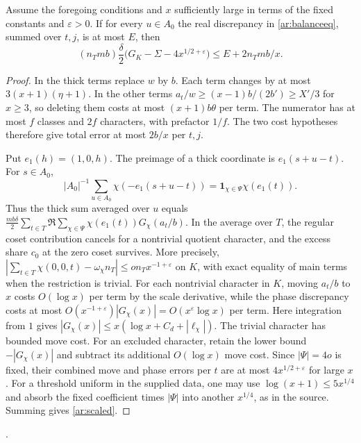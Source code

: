 \begin{lemma}\label{ar:extract}
Assume the foregoing conditions and \(x\) sufficiently large in terms of the fixed constants and \(\varepsilon>0\). If for every \(u\in A_0\) the real discrepancy in \eqref{ar:balanceeq}, summed over \(t,j\), is at most \(E\), then
\[
 (n_Tmb)\frac{\delta}{2}\bigl(G_K-\Sigma-4x^{1/2+\varepsilon}\bigr)
 \le E+2n_Tmb/x.
 \tag{*}\label{ar:scaled}
\]
\end{lemma}
\begin{proof}
In the thick terms replace \(w\) by \(b\). Each term changes by at most \(3(x+1)(\eta+1)\). In the other terms \(a_t/w\ge (x-1)b/(2b')\ge X'/3\) for \(x\ge3\), so deleting them costs at most \((x+1)b\theta\) per term. The numerator has at most \(f\) classes and \(2f\) characters, with prefactor \(1/f\). The two cost hypotheses therefore give total error at most \(2b/x\) per \(t,j\).

Put \(e_1(h)=(1,0,h)\). The preimage of a thick coordinate is \(e_1(s+u-t)\). For \(s\in A_0\),
\[
 |A_0|^{-1}\sum_{u\in A_0}\chi(-e_1(s+u-t))
 =\mathbf1_{\chi\in\Psi}\chi(e_1(t)).
\]
Thus the thick sum averaged over \(u\) equals
\(\frac{mb\delta}{2}\sum_{t\in T}\Re\sum_{\chi\in\Psi}\chi(e_1(t))G_\chi(a_t/b)\).
In the average over \(T\), the regular coset contribution cancels for a nontrivial quotient character, and the excess share \(c_0\) at the zero coset survives. More precisely,
\(\left|\sum_{t\in T}\chi(0,0,t)-\omega_\chi n_T\right|\le o n_T x^{-1+\varepsilon}\)
on \(K\), with exact equality of main terms when the restriction is trivial. For each nontrivial character in \(K\), moving \(a_t/b\) to \(x\) costs \(O(\log x)\) per term by the scale derivative, while the phase discrepancy costs at most \(O(x^{-1+\varepsilon})|G_\chi(x)|=O(x^\varepsilon\log x)\) per term. Here integration from \(1\) gives \(|G_\chi(x)|\le x(\log x+C_d+|\ell_\chi|)\). The trivial character has bounded move cost. For an excluded character, retain the lower bound \(-|G_\chi(x)|\) and subtract its additional \(O(\log x)\) move cost. Since \(|\Psi|=4o\) is fixed, their combined move and phase errors per \(t\) are at most \(4x^{1/2+\varepsilon}\) for large \(x\). For a threshold uniform in the supplied data, one may use \(\log(x+1)\le5x^{1/4}\) and absorb the fixed coefficient times \(|\Psi|\) into another \(x^{1/4}\), as in the source. Summing gives \eqref{ar:scaled}.
\end{proof}
\noindent
{}\quad
{}\quad
{}\quad
{}.

